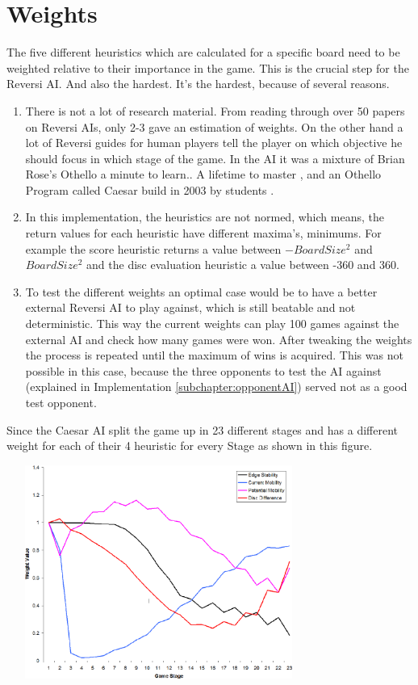 \section{Weights}
The five different heuristics which are calculated for a specific board need to be weighted relative to their importance in the game. This is the crucial step for the Reversi AI. And also the hardest. It’s the hardest, because of several reasons.
\begin{enumerate}
	\item There is not a lot of research material. From reading through over 50 papers on Reversi AIs, only 2-3 gave an estimation of weights. On the other hand a lot of Reversi guides for human players tell the player on which objective he should focus in which stage of the game. In the AI it was a mixture of Brian Rose’s Othello a minute to learn.. A lifetime to master \cite{BrianRose}, and an Othello Program called Caesar build in 2003 by students \cite{Caesar}.
	\item In this implementation, the heuristics are not normed, which means, the return values for each heuristic have different maxima’s, minimums. For example the score heuristic returns a value between $-BoardSize^2$ and  $BoardSize^2$ and the disc evaluation heuristic a value between -360 and 360.
	\item To test the different weights an optimal case would be to have a better external Reversi AI to play against, which is still beatable and not deterministic. This way the current weights can play 100 games against the external AI and check how many games were won. After tweaking the weights the process is repeated until the maximum of wins is acquired. This was not possible in this case, because the three opponents to test the AI against (explained in Implementation \ref{subchapter:opponentAI}) served not as a good test opponent.
\end{enumerate}
Since the Caesar AI split the game up in 23 different stages and has a different weight for each of their 4 heuristic for every Stage as shown in this figure.\newline
\begin{center}
	\includegraphics[width=10cm, height=7cm]{pictures/Ceasar}
\end{center}
